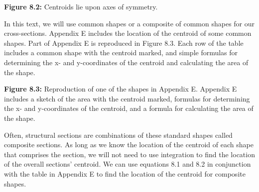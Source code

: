 \documentclass[
  letterpaper,
  DIV=11,
  numbers=noendperiod]{scrreprt}
\begin{document}
\textbf{Figure 8.2:} Centroids lie upon axes of symmetry.

In this text, we will use common shapes or a composite of common shapes
for our cross-sections. Appendix E includes the location of the centroid
of some common shapes. Part of Appendix E is reproduced in Figure 8.3.
Each row of the table includes a common shape with the centroid marked,
and simple formulas for determining the x- and y-coordinates of the
centroid and calculating the area of the shape.

\textbf{Figure 8.3:} Reproduction of one of the shapes in Appendix E.
Appendix E includes a sketch of the area with the centroid marked,
formulas for determining the x- and y-coordinates of the centroid, and a
formula for calculating the area of the shape.

Often, structural sections are combinations of these standard shapes
called composite sections. As long as we know the location of the
centroid of each shape that comprises the section, we will not need to
use integration to find the location of the overall sections' centroid.
We can use equations 8.1 and 8.2 in conjunction with the table in
Appendix E to find the location of the centroid for composite shapes.
\end{document}

